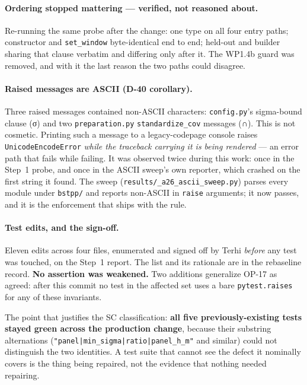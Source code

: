 \documentclass[
  10pt,
]{article}
\begin{document}
\paragraph{Ordering stopped mattering --- verified, not reasoned about.}
Re-running the same probe after the change: one type on all four entry paths; constructor and \texttt{set\_window} byte-identical end to end; held-out and builder sharing that clause verbatim and differing only after it. The WP1.4b guard was removed, and with it the last reason the two paths could disagree.

\paragraph{Raised messages are ASCII (D-40 corollary).}
Three raised messages contained non-ASCII characters: \texttt{config.py}'s sigma-bound clause (σ) and two \texttt{preparation.py} \texttt{standardize\_cov} messages (∩). This is not cosmetic. Printing such a message to a legacy-codepage console raises \texttt{UnicodeEncodeError} \emph{while the traceback carrying it is being rendered} --- an error path that fails while failing. It was observed twice during this work: once in the Step~1 probe, and once in the ASCII sweep's own reporter, which crashed on the first string it found. The sweep (\texttt{results/\allowbreak{}\_a26\_ascii\_sweep.py}) parses every module under \texttt{bstpp/} and reports non-ASCII in \texttt{raise} arguments; it now passes, and it is the enforcement that ships with the rule.

\paragraph{Test edits, and the sign-off.}
Eleven edits across four files, enumerated and signed off by Terhi \emph{before} any test was touched, on the Step~1 report. The list and its rationale are in the rebaseline record. \textbf{No assertion was weakened.} Two additions generalize OP-17 as agreed: after this commit no test in the affected set uses a bare \texttt{pytest.raises} for any of these invariants.

The point that justifies the SC classification: \textbf{all five previously-existing tests stayed green across the production change}, because their substring alternations (\texttt{"panel|min\_sigma|ratio|panel\_h\_m"} and similar) could not distinguish the two identities. A test suite that cannot see the defect it nominally covers is the thing being repaired, not the evidence that nothing needed repairing.
\end{document}
